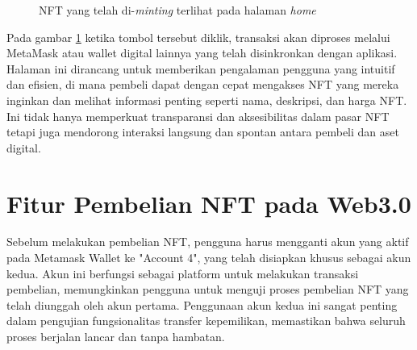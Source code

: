   \begin{figure} [H] \centering
    \caption{NFT yang telah di-\emph{minting} terlihat pada halaman \emph{home}}
    \label{fig:listhome}
    \end{figure}

    Pada gambar \ref{fig:listhome} ketika tombol tersebut diklik, transaksi akan diproses melalui MetaMask atau wallet digital lainnya yang telah disinkronkan dengan aplikasi. Halaman ini dirancang untuk memberikan pengalaman pengguna yang intuitif dan efisien, di mana pembeli dapat dengan cepat mengakses NFT yang mereka inginkan dan melihat informasi penting seperti nama, deskripsi, dan harga NFT. Ini tidak hanya memperkuat transparansi dan aksesibilitas dalam pasar NFT tetapi juga mendorong interaksi langsung dan spontan antara pembeli dan aset digital.

\section{Fitur Pembelian NFT pada Web3.0}
Sebelum melakukan pembelian NFT, pengguna harus mengganti akun yang aktif pada Metamask Wallet ke "Account 4", yang telah disiapkan khusus sebagai akun kedua. Akun ini berfungsi sebagai platform untuk melakukan transaksi pembelian, memungkinkan pengguna untuk menguji proses pembelian NFT yang telah diunggah oleh akun pertama. Penggunaan akun kedua ini sangat penting dalam pengujian fungsionalitas transfer kepemilikan, memastikan bahwa seluruh proses berjalan lancar dan tanpa hambatan. 
      
